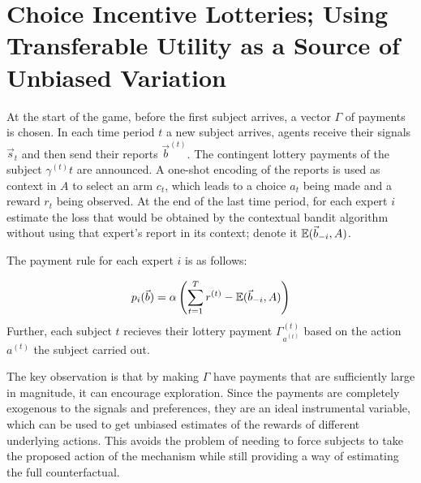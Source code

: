 
\section{Choice Incentive Lotteries;  Using Transferable Utility as a Source of Unbiased Variation}


\begin{mech}
At the start of the game, before the first subject arrives, a vector $\Gamma$ of payments is chosen.
   In each time period $t$ a new subject arrives, agents receive their signals $\vec s_t$ and then send their reports $\vec b^{(t)}$. The contingent lottery payments of the subject $\gamma^{(t)}t$ are announced. A one-shot encoding of the reports is used as context in $A$ to select an arm $c_t$, which leads to a choice $a_t$ being made and a reward $r_t$ being observed.%
 At the end of the last time period, for each expert $i$ estimate the loss that would be obtained by the contextual bandit algorithm without using that expert's report in its context; denote it $\operatorname*{\mathbb E}({\vec b_{-i}},A)$.

The payment rule for each expert $i$ is as follows:

\[
   p_i(\vec b) =  \alpha \left(\sum_{t=1}^T r^{(t)} -  \operatorname*{\mathbb E}(\vec b_{-i},A)\right)
\]
   Further, each subject $t$ recieves their lottery payment $\Gamma^{(t)}_{a^{(t)}}$ based on the action $a^{(t)}$ the subject carried out.
\end{mech}

The key observation is that by making $\Gamma$ have payments that are sufficiently large in magnitude, it can encourage exploration.
Since the payments are completely exogenous to the signals and preferences, they are an ideal instrumental variable, which can be used to get unbiased estimates of the rewards of different underlying actions. %
This avoids the problem of needing to force subjects to take the proposed action of the mechanism while still providing a way of estimating the full counterfactual.


